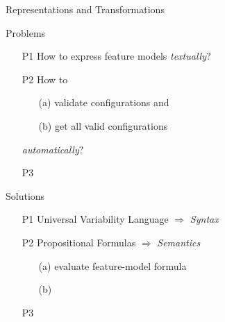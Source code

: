 \begin{frame}{Representations and Transformations}
\begin{mycolumns}[widths={52,48}]
	\mynextcolumn
		\begin{note}{Problems}
			\begin{enumerate}
				\item[P1] How to express feature models \emph{textually}?
				\item[P2] How to 
				\begin{itemize}
					\item[(a)] validate configurations and
					\item[(b)] get all valid configurations
				\end{itemize}
				\emph{automatically}?
				\item[P3] \color{gray}{(How to reverse engineer feature models?)}
			\end{enumerate}
		\end{note}
		\begin{note}{Solutions}
			\begin{enumerate}
				\item[P1] Universal Variability Language $\Rightarrow$ \emph{Syntax}
				\item[P2] Propositional Formulas $\Rightarrow$ \emph{Semantics}
				\begin{itemize}
					\item[(a)] evaluate feature-model formula
					\item[(b)] \lecturemodeling\partc{}
				\end{itemize}
				\item[P3] \color{gray}{(i) e.g., \bakarnaturallanguage\\(ii) e.g., \czarneckithereandbackagain}
			\end{enumerate}
		\end{note}
	\end{mycolumns}
\end{frame}


